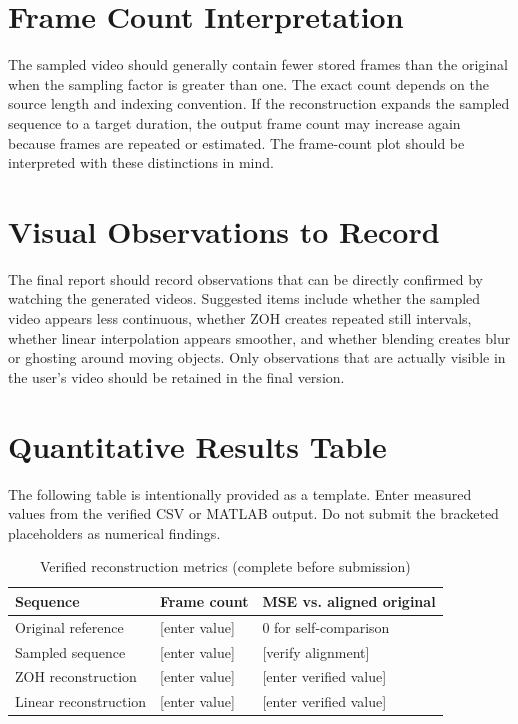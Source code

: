 \documentclass[12pt,a4paper,oneside]{report}
\begin{document}
\section{Frame Count Interpretation}
The sampled video should generally contain fewer stored frames than the original when the sampling factor is greater than one. The exact count depends on the source length and indexing convention. If the reconstruction expands the sampled sequence to a target duration, the output frame count may increase again because frames are repeated or estimated. The frame-count plot should be interpreted with these distinctions in mind.

\section{Visual Observations to Record}
The final report should record observations that can be directly confirmed by watching the generated videos. Suggested items include whether the sampled video appears less continuous, whether ZOH creates repeated still intervals, whether linear interpolation appears smoother, and whether blending creates blur or ghosting around moving objects. Only observations that are actually visible in the user's video should be retained in the final version.

\section{Quantitative Results Table}
The following table is intentionally provided as a template. Enter measured values from the verified CSV or MATLAB output. Do not submit the bracketed placeholders as numerical findings.
\begin{table}[H]
\centering
\caption{Verified reconstruction metrics (complete before submission)}
\begin{tabular}{p{}p{}p{}}
\toprule
\textbf{Sequence} & \textbf{Frame count} & \textbf{MSE vs. aligned original}\\
\midrule
Original reference & [enter value] & 0 for self-comparison\\
Sampled sequence & [enter value] & [verify alignment]\\
ZOH reconstruction & [enter value] & [enter verified value]\\
Linear reconstruction & [enter value] & [enter verified value]\\
\bottomrule
\end{tabular}
\end{table}
\end{document}
